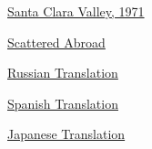               
            
            
              
            
            
              
            
            
              
                
              
              
              
                \href{http://www.aliciapatterson.org/APF001971/Downie/Downie02/Downie02.html}{Santa Clara Valley, 1971}


              
              
              
                
              
              
              
                \href{http://www.post-gazette.com/pg/04363/433484.stm}{Scattered Abroad}


              
            
            
              
            
            
              
            
            
              
                
              
              
              
                \href{http://shadtchnev.livejournal.com/67958.html}{Russian Translation}


              
              
              
                
              
              
              
                \href{http://simpleoption.com/ensayo-como-ser-silicon-valley.html}{Spanish Translation}


              
            
            
              
            
            
              
            
            
              
                
              
              
              
                \href{http://d.hatena.ne.jp/lionfan/20060802}{Japanese Translation}


